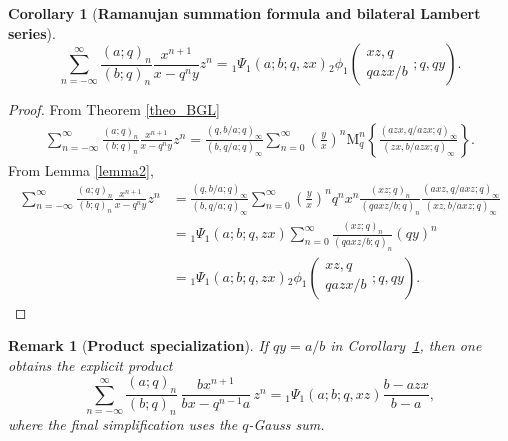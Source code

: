 \documentclass[12pt]{article}
\newcommand{\M}{\mathrm{M}}
\newtheorem{corollary}{Corollary}
\newtheorem{remark}{Remark}
\begin{document}
\begin{corollary}[\bf Ramanujan summation formula and bilateral Lambert series]\label{coro_R-L}
\begin{equation}
    \sum_{n=-\infty}^{\infty}\frac{(a;q)_n}{(b;q)_n}\frac{x^{n+1}}{x-q^ny}z^n={}_{1}\Psi_{1}(a;b;q,zx){}_{2}\phi_{1}\left(
    \begin{array}{c}
         xz,q \\
         qazx/b
    \end{array}
    ;q,qy
    \right).
\end{equation}
\end{corollary}
\begin{proof}
From Theorem \ref{theo_BGL}
    \begin{align*}
        \sum_{n=-\infty}^{\infty}\frac{(a;q)_n}{(b;q)_n}\frac{x^{n+1}}{x-q^ny}z^n
        =\frac{(q,b/a;q)_{\infty}}{(b,q/a;q)_{\infty}}\sum_{n=0}^{\infty}\left(\frac{y}{x}\right)^n\M_q^n\left\{\frac{(azx,q/azx;q)_{\infty}}{(zx,b/azx;q)_{\infty}}\right\}.
    \end{align*}
From Lemma \ref{lemma2},
    \begin{align*}
        \sum_{n=-\infty}^{\infty}\frac{(a;q)_n}{(b;q)_n}\frac{x^{n+1}}{x-q^ny}z^n
        &=\frac{(q,b/a;q)_{\infty}}{(b,q/a;q)_{\infty}}\sum_{n=0}^{\infty}\left(\frac{y}{x}\right)^nq^nx^n\frac{(xz;q)_{n}}{(qaxz/b;q)_{n}}\frac{(axz,q/axz;q)_{\infty}}{(xz,b/axz;q)_{\infty}}\\
        &={}_{1}\Psi_{1}(a;b;q,zx)\sum_{n=0}^{\infty}\frac{(xz;q)_{n}}{(qaxz/b;q)_{n}}(qy)^n\\
        &={}_{1}\Psi_{1}(a;b;q,zx){}_{2}\phi_{1}\left(
    \begin{array}{c}
         xz,q \\
         qazx/b
    \end{array}
    ;q,qy
    \right).
    \end{align*}
\end{proof}

\begin{remark}[\bf Product specialization]\label{rem:productSpecialization}
If $qy=a/b$ in Corollary~\ref{coro_R-L}, then one obtains the explicit product
\begin{equation}
\sum_{n=-\infty}^{\infty}\frac{(a;q)_n}{(b;q)_n}\,
\frac{bx^{n+1}}{bx-q^{n-1} a}\,z^n
=
{}_{1}\Psi_{1}(a;b;q,xz)\frac{b-azx}{b-a},
\end{equation}
where the final simplification uses the \(q\)-Gauss sum.
\end{remark}
\end{document}
